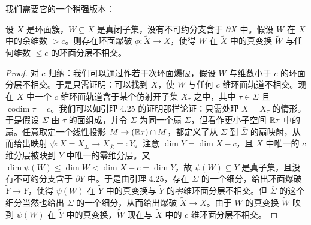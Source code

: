 我们需要它的一个稍强版本：

\begin{lemma}
设 $X$ 是环面簇，$W\subseteq X$ 是真闭子集，没有不可约分支含于 $\partial X$ 中。假设 $W$ 在 $X$ 中的余维数 $>c$。则存在环面爆破 $\phi:\widetilde X\to X$，使得 $W$ 在 $\widetilde X$ 中的真变换 $\widetilde W$ 与任何维数 $\le c$ 的环面分层不相交。
\end{lemma}

\begin{proof}
对 $c$ 归纳：我们可以通过作若干次环面爆破，假设 $W$ 与维数小于 $c$ 的环面分层不相交。于是只需证明：可以找到 $\widetilde X$，使 $\widetilde W$ 与任何 $c$ 维环面轨道不相交。现在 $X$ 中一个 $c$ 维环面轨道含于某个仿射开子集 $X_\tau$ 之中，其中 $\tau\in\Sigma$ 且 $\operatorname{codim}\tau=c$。我们可以如引理 4.25 的证明那样论证：只需处理 $X=X_\tau$ 的情形。
于是假设 $\Sigma$ 由 $\tau$ 的面组成，并令 $\overline\Sigma$ 为同一个扇 $\Sigma$，但看作更小子空间 $\mathbb{R}\tau$ 中的扇。任意取定一个线性投影 $M\to(\mathbb{R}\tau)\cap M$，都定义了从 $\Sigma$ 到 $\overline\Sigma$ 的扇映射，从而给出映射 $\psi:X=X_\Sigma\to X_{\overline\Sigma}=:Y$。注意 $\dim Y=\dim X-c$，且 $X$ 中唯一的 $c$ 维分层被映到 $Y$ 中唯一的零维分层。又 $\dim\psi(W)\le\dim W<\dim X-c=\dim Y$，故 $\psi(W)\subseteq Y$ 是真子集，且没有不可约分支含于 $\partial Y$ 中。于是由引理 4.25，存在 $\overline\Sigma$ 的一个细分，给出环面爆破 $\widetilde Y\to Y$，使得 $\psi(W)$ 在 $\widetilde Y$ 中的真变换与 $\widetilde Y$ 的零维环面分层不相交。但 $\overline\Sigma$ 的这个细分当然也给出 $\Sigma$ 的一个细分，从而给出爆破 $\widetilde X\to X$。由于 $W$ 的真变换 $\widetilde W$ 映到 $\psi(W)$ 在 $\widetilde Y$ 中的真变换，$\widetilde W$ 现在与 $\widetilde X$ 中的 $c$ 维环面分层不相交。
\end{proof}

